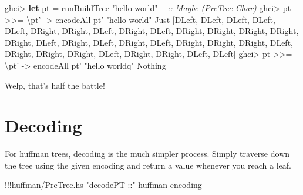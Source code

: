 \documentclass[]{article}
\newenvironment{Shaded}{}{}
\newcommand{\KeywordTok}[1]{\textcolor[rgb]{0.00,0.44,0.13}{\textbf{{#1}}}}
\newcommand{\DataTypeTok}[1]{\textcolor[rgb]{0.56,0.13,0.00}{{#1}}}
\newcommand{\StringTok}[1]{\textcolor[rgb]{0.25,0.44,0.63}{{#1}}}
\newcommand{\CommentTok}[1]{\textcolor[rgb]{0.38,0.63,0.69}{\textit{{#1}}}}
\newcommand{\OtherTok}[1]{\textcolor[rgb]{0.00,0.44,0.13}{{#1}}}
\newcommand{\FunctionTok}[1]{\textcolor[rgb]{0.02,0.16,0.49}{{#1}}}
\newcommand{\NormalTok}[1]{{#1}}
\begin{document}
\begin{Shaded}
\begin{Highlighting}[]
\NormalTok{ghci}\FunctionTok{>} \KeywordTok{let} \NormalTok{pt }\FunctionTok{=} \NormalTok{runBuildTree }\StringTok{"hello world"}          \CommentTok{-- :: Maybe (PreTree Char)}
\NormalTok{ghci}\FunctionTok{>} \NormalTok{pt }\FunctionTok{>>=} \NormalTok{\textbackslash{}pt' }\OtherTok{->} \NormalTok{encodeAll pt' }\StringTok{"hello world"}
\DataTypeTok{Just} \NormalTok{[}\DataTypeTok{DLeft}\NormalTok{, }\DataTypeTok{DLeft}\NormalTok{, }\DataTypeTok{DLeft}\NormalTok{, }\DataTypeTok{DLeft}\NormalTok{, }\DataTypeTok{DLeft}\NormalTok{, }\DataTypeTok{DRight}\NormalTok{, }\DataTypeTok{DRight}\NormalTok{, }\DataTypeTok{DLeft}\NormalTok{, }\DataTypeTok{DRight}\NormalTok{, }\DataTypeTok{DLeft}\NormalTok{,}
\DataTypeTok{DRight}\NormalTok{, }\DataTypeTok{DRight}\NormalTok{, }\DataTypeTok{DRight}\NormalTok{, }\DataTypeTok{DRight}\NormalTok{, }\DataTypeTok{DRight}\NormalTok{, }\DataTypeTok{DLeft}\NormalTok{, }\DataTypeTok{DRight}\NormalTok{, }\DataTypeTok{DLeft}\NormalTok{, }\DataTypeTok{DRight}\NormalTok{, }\DataTypeTok{DLeft}\NormalTok{,}
\DataTypeTok{DRight}\NormalTok{, }\DataTypeTok{DRight}\NormalTok{, }\DataTypeTok{DRight}\NormalTok{, }\DataTypeTok{DLeft}\NormalTok{, }\DataTypeTok{DRight}\NormalTok{, }\DataTypeTok{DRight}\NormalTok{, }\DataTypeTok{DRight}\NormalTok{, }\DataTypeTok{DLeft}\NormalTok{, }\DataTypeTok{DRight}\NormalTok{, }\DataTypeTok{DRight}\NormalTok{,}
\DataTypeTok{DLeft}\NormalTok{, }\DataTypeTok{DLeft}\NormalTok{]}
\NormalTok{ghci}\FunctionTok{>} \NormalTok{pt }\FunctionTok{>>=} \NormalTok{\textbackslash{}pt' }\OtherTok{->} \NormalTok{encodeAll pt' }\StringTok{"hello worldq"}
\DataTypeTok{Nothing}
\end{Highlighting}
\end{Shaded}

Welp, that's half the battle!

\section{Decoding}\label{decoding}

For huffman trees, decoding is the much simpler process. Simply traverse
down the tree using the given encoding and return a value whenever you
reach a leaf.

\begin{Shaded}
\begin{Highlighting}[]
\FunctionTok{!!!}\NormalTok{huffman}\FunctionTok{/}\NormalTok{PreTree.hs }\StringTok{"decodePT ::"} \NormalTok{huffman}\FunctionTok{-}\NormalTok{encoding}
\end{Highlighting}
\end{Shaded}
\end{document}

